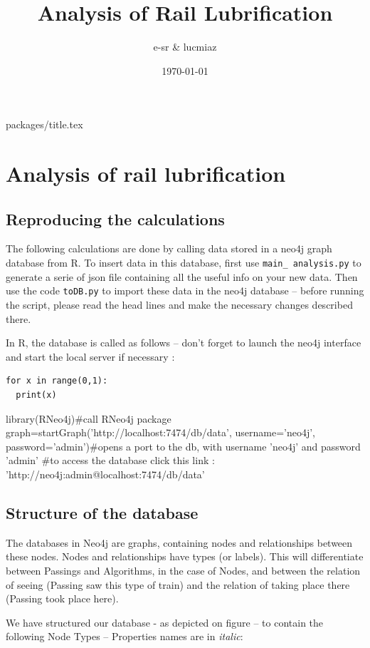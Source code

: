 \documentclass{article}\usepackage[]{graphicx}\usepackage[]{color}
\author{e-sr \& lucmiaz}
\date{\today}
\title{Analysis of Rail Lubrification}
\begin{document}
{packages/title.tex}

\section{Analysis of rail lubrification}
\subsection{Reproducing the calculations}
The following calculations are done by calling data stored in a neo4j graph database from R. To insert data in this database, first use {\tt main\_ analysis.py} to generate a serie of json file containing all the useful info on your new data. Then use the code {\tt toDB.py} to import these data in the neo4j database -- before running the script, please read the head lines and make the necessary changes described there.

In R, the database is called as follows -- don't forget to launch the neo4j interface and start the local server if necessary :
\begin{lstlisting}[style=mypython,caption='hello']
for x in range(0,1):
  print(x)
\end{lstlisting}
\begin{code}
\begin{Schunk}
\begin{Sinput}
library(RNeo4j)#call RNeo4j package
graph=startGraph('http://localhost:7474/db/data', username='neo4j', password='admin')#opens a port to the db, with username 'neo4j' and password 'admin'
#to access the database click this link : 'http://neo4j:admin@localhost:7474/db/data'
\end{Sinput}
\end{Schunk}
\end{code}
\subsection{Structure of the database}

The databases in Neo4j are graphs, containing nodes and relationships between these nodes. Nodes and relationships have types (or labels). This will differentiate between Passings and Algorithms, in the case of Nodes, and between the relation of seeing (Passing saw this type of train) and the relation of taking place there (Passing took place here).

We have structured our database - as depicted on figure -- to contain the following Node Types -- Properties names are in {\it italic}:
\end{document}
